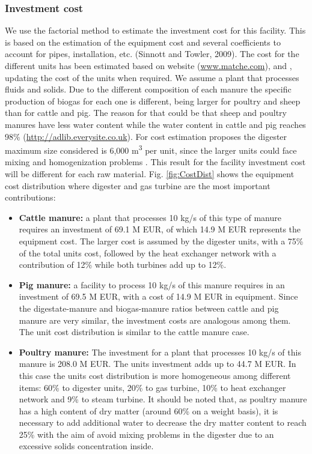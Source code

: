 \begin{refsection}[referencesCh2]
\subsubsection{Investment cost}
We use the factorial method to estimate the investment cost for this facility. This is based on the estimation of the equipment cost and several coefficients to account for pipes, installation, etc. (Sinnott and Towler, 2009). The cost for the different units has been estimated based on \citet{Matche} website (\url{www.matche.com}), \citet{towler2009chemical} and \citet{peters2003plant}, updating the cost of the units when required. We assume a plant that processes fluids and solids. Due to the different composition of each manure the specific production of biogas for each one is different, being larger for poultry and sheep than for cattle and pig. The reason for that could be that sheep and poultry manures have less water content while the water content in cattle and pig reaches 98\% (\url{http://adlib.everysite.co.uk}). For cost estimation proposes the digester maximum size considered is 6,000 m\textsuperscript{3} per unit, since the larger units could face mixing and homogenization problems \citep{rohstoffe2010guia}. This result for the facility investment cost will be different for each raw material. Fig. \ref{fig:CostDist} shows the equipment cost distribution where digester and gas turbine are the most important contributions:

\begin{itemize}
	\item \textbf{Cattle manure:} a plant that processes 10 kg/s of this type of manure requires an investment of 69.1 M EUR, of which 14.9 M EUR represents the equipment cost. The larger cost is assumed by the digester units, with a 75\% of the total units cost, followed by the heat exchanger network with a contribution of 12\% while both turbines add up to 12\%.
	
	\item \textbf{Pig manure:} a facility to process 10 kg/s of this manure requires in an investment of 69.5 M EUR, with a cost of 14.9 M EUR in equipment. Since the digestate-manure and biogas-manure ratios between cattle and pig manure are very similar, the investment	costs are analogous among them. The unit cost distribution is similar to the cattle manure case.
	
	\item \textbf{Poultry manure:} The investment for a plant that processes 10 kg/s of this manure is 208.0 M EUR. The units investment adds up to 44.7 M EUR. In this case the units cost distribution is more homogeneous among different items: 60\% to digester units, 20\% to gas turbine, 10\% to heat exchanger network and 9\% to steam turbine. It should be noted that, as poultry manure has a	high content of dry matter (around 60\% on a weight basis), it is necessary to add additional water to decrease the dry matter content to reach 25\% with the aim of avoid mixing problems in the digester due to an excessive solids concentration inside.
	

\end{itemize}
\end{refsection}
